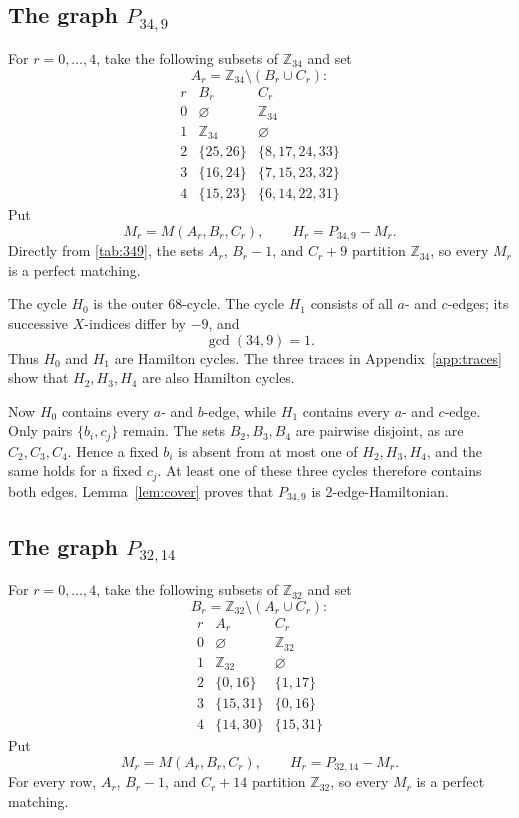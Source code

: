 \documentclass[11pt]{amsart}
\newcommand{\Z}{\mathbb Z}
\begin{document}
\subsection{The graph \texorpdfstring{$P_{34,9}$}{P34,9}}

For $r=0,\dots,4$, take the following subsets of $\Z_{34}$ and set
\[
 A_r=\Z_{34}\setminus(B_r\cup C_r):
\]
\[
\begin{array}{c|c|c}
 r & B_r & C_r \\
\hline
 0 & \varnothing & \Z_{34} \\
 1 & \Z_{34} & \varnothing \\
 2 & \{25,26\} & \{8,17,24,33\} \\
 3 & \{16,24\} & \{7,15,23,32\} \\
 4 & \{15,23\} & \{6,14,22,31\}
\end{array}
\tag{3.1}\label{tab:349}
\]
Put
\[
 M_r=M(A_r,B_r,C_r),
 \qquad
 H_r=P_{34,9}-M_r.
\]
Directly from \eqref{tab:349}, the sets $A_r$, $B_r-1$, and $C_r+9$
partition $\Z_{34}$, so every $M_r$ is a perfect matching.

The cycle $H_0$ is the outer $68$-cycle. The cycle $H_1$ consists of all
$a$- and $c$-edges; its successive $X$-indices differ by $-9$, and
\[
 \gcd(34,9)=1.
\]
Thus $H_0$ and $H_1$ are Hamilton cycles. The three traces in
Appendix~\ref{app:traces} show that $H_2,H_3,H_4$ are also Hamilton
cycles.

Now $H_0$ contains every $a$- and $b$-edge, while $H_1$ contains every
$a$- and $c$-edge. Only pairs $\{b_i,c_j\}$ remain. The sets
$B_2,B_3,B_4$ are pairwise disjoint, as are $C_2,C_3,C_4$. Hence a fixed
$b_i$ is absent from at most one of $H_2,H_3,H_4$, and the same holds for
a fixed $c_j$. At least one of these three cycles therefore contains both
edges. Lemma~\ref{lem:cover} proves that $P_{34,9}$ is
2-edge-Hamiltonian.

\subsection{The graph \texorpdfstring{$P_{32,14}$}{P32,14}}

For $r=0,\dots,4$, take the following subsets of $\Z_{32}$ and set
\[
 B_r=\Z_{32}\setminus(A_r\cup C_r):
\]
\[
\begin{array}{c|c|c}
 r & A_r & C_r \\
\hline
 0 & \varnothing & \Z_{32} \\
 1 & \Z_{32} & \varnothing \\
 2 & \{0,16\} & \{1,17\} \\
 3 & \{15,31\} & \{0,16\} \\
 4 & \{14,30\} & \{15,31\}
\end{array}
\tag{3.2}\label{tab:3214}
\]
Put
\[
 M_r=M(A_r,B_r,C_r),
 \qquad
 H_r=P_{32,14}-M_r.
\]
For every row, $A_r$, $B_r-1$, and $C_r+14$ partition $\Z_{32}$, so every
$M_r$ is a perfect matching.
\end{document}
